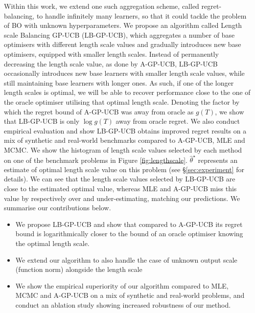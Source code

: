 \documentclass{article}
\theoremstyle{plain}
\theoremstyle{definition}
\theoremstyle{remark}
\theoremstyle{plain}
\begin{document}
Within this work, we extend one such aggregation scheme, called regret-balancing, to handle infinitely many learners, so that it could tackle the problem of BO with unknown hyperparameters. We propose an algorithm called Length scale Balancing GP-UCB (LB-GP-UCB), which aggregates a number of base optimisers with different length scale values and gradually introduces new base optimisers, equipped with smaller length scales. Instead of permanently decreasing the length scale value, as done by A-GP-UCB, LB-GP-UCB occasionally introduces new base learners with smaller length scale values, while still maintaining base learners with longer ones. As such, if one of the longer length scales is optimal, we will be able to recover performance close to the one of the oracle optimiser utilising that optimal length scale. Denoting the factor by which the regret bound of A-GP-UCB was away from oracle as $g(T)$,  we show that LB-GP-UCB is only $\log g(T)$ away from oracle regret. We also conduct empirical evaluation and show LB-GP-UCB obtains improved regret results on a mix of synthetic and real-world benchmarks compared to A-GP-UCB, MLE and MCMC. We show the histogram of length scale values selected by each method on one of the benchmark problems in Figure \ref{fig:lengthscale}. $\hat{\theta}^\star$ represents an estimate of optimal length scale value on this problem (see §\ref{sec:experiment} for details). We can see that the length scale values selected by LB-GP-UCB are close to the estimated optimal value, whereas MLE and A-GP-UCB miss this value by respectively over and under-estimating, matching our predictions. We summarise our contributions below.


\begin{itemize}
    \item We propose LB-GP-UCB and show that compared to A-GP-UCB its regret bound is logarithmically closer to the bound of an oracle optimiser knowing the optimal length scale.
    \item We extend our algorithm to also handle the case of unknown output scale (function norm) alongside the length scale
    \item We show the empirical superiority of our algorithm compared to MLE, MCMC and A-GP-UCB on a mix of synthetic and real-world problems, and conduct an ablation study showing increased robustness of our method.

\end{itemize}
\end{document}
